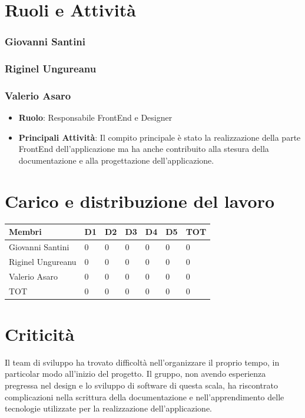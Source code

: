 \documentclass{report}
\begin{document}
\section{Ruoli e Attività}

\subsubsection{Giovanni Santini}

\subsubsection{Riginel Ungureanu}

\subsubsection{Valerio Asaro}
\begin{itemize}
	\item \textbf{Ruolo}: Responsabile FrontEnd e Designer
	\item \textbf{Principali Attività}: Il compito principale è stato la realizzazione della parte FrontEnd dell'applicazione ma ha anche contribuito alla stesura della documentazione e alla progettazione dell'applicazione.
\end{itemize}

\section{Carico e distribuzione del lavoro}
\begin{center} %
	\centering
	\begin{tabular}{ |p{3cm}|p{1cm}|p{1cm}|p{1cm}|p{1cm}|p{1cm}|p{1cm}|  }
		\hline
		\centering  Membri  &  D1 &  D2 & D3 & D4 & D5 & TOT\\ %
		\hline
		\centering Giovanni Santini & 0 & 0 & 0 & 0 & 0 & 0 \\
		\hline
		\centering Riginel Ungureanu & 0 & 0 & 0 & 0 & 0 & 0 \\
		\hline
		\centering Valerio Asaro & 0 & 0 & 0 & 0 & 0 & 0 \\
		\hline
		\centering TOT & 0 & 0 & 0 & 0 & 0 & 0 \\
		\hline
	\end{tabular}
\end{center}

\section{Criticità}
Il team di sviluppo ha trovato difficoltà nell'organizzare il proprio tempo, in particolar modo all'inizio del progetto. Il gruppo, non avendo esperienza pregressa nel design e lo sviluppo di software di questa scala, ha riscontrato complicazioni nella scrittura della documentazione e nell'apprendimento delle tecnologie utilizzate per la realizzazione dell'applicazione.
\end{document}
